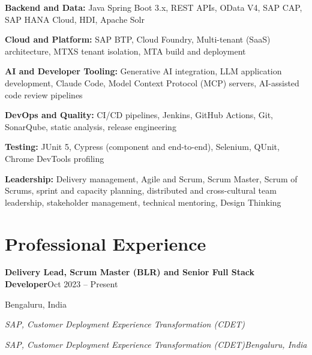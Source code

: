 \documentclass[11pt,a4paper]{article}
\makeatletter
\newcommand{\role}[2]{{\parfillskip=0pt\relax\noindent\textbf{#1}\hfill #2\par}}
\newcommand{\org}[2]{%
  \def\@tmp{#2}%
  \ifx\@tmp\@empty
    {\noindent\textit{#1}\par}%
  \else
    {\parfillskip=0pt\relax\noindent\textit{#1}\hfill\textit{#2}\par}%
  \fi
  \vspace{2pt}}
\makeatother
\begin{document}
\textbf{Backend and Data:} Java Spring Boot 3.x, REST APIs, OData V4, SAP CAP, SAP HANA Cloud, HDI, Apache Solr

\textbf{Cloud and Platform:} SAP BTP, Cloud Foundry, Multi-tenant (SaaS) architecture, MTXS tenant isolation, MTA build and deployment

\textbf{AI and Developer Tooling:} Generative AI integration, LLM application development, Claude Code, Model Context Protocol (MCP) servers, AI-assisted code review pipelines

\textbf{DevOps and Quality:} CI/CD pipelines, Jenkins, GitHub Actions, Git, SonarQube, static analysis, release engineering

\textbf{Testing:} JUnit 5, Cypress (component and end-to-end), Selenium, QUnit, Chrome DevTools profiling

\textbf{Leadership:} Delivery management, Agile and Scrum, Scrum Master, Scrum of Scrums, sprint and capacity planning, distributed and cross-cultural team leadership, stakeholder management, technical mentoring, Design Thinking

\section{Professional Experience}

\role{Delivery Lead, Scrum Master (BLR) and Senior Full Stack Developer}{Oct 2023 -- Present}
\org{SAP, Customer Deployment Experience Transformation (CDET)}{Bengaluru, India}
\end{document}
